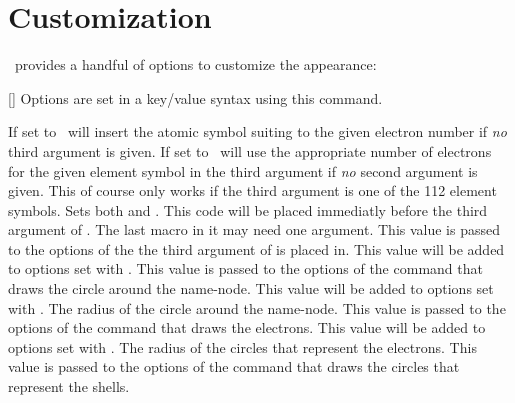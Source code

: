\documentclass[load-preamble+]{cnltx-doc}
\begin{document}
\section{Customization}
\BOHR\ provides a handful of options to customize the appearance:
\begin{commands}
  []
    Options are set in a key/value syntax using this command.
\end{commands}
\begin{options}
    If set to  \BOHR\ will insert the atomic symbol suiting to the
    given electron number if \emph{no} third argument is given.
    If set to  \BOHR\ will use the appropriate number of electrons
    for the given element symbol in the third argument if \emph{no} second
    argument is given.  This of course only works if the third argument is one
    of the 112 element symbols.
    Sets both  and .
  \Default
    This code will be placed immediatly before the third argument of
    .  The last macro in it may need one argument.
  \Default
    This value is passed to the options of the  the third argument
    of  is placed in.
  \Default
    This value will be added to options set with .
    This value is passed to the options of the  command that draws
    the circle around the name-node.
  \Default
    This value will be added to options set with .
  \Default{1em}
    The radius of the circle around the name-node.
    This value is passed to the options of the  command that draws
    the electrons.
  \Default
    This value will be added to options set with .
  \Default{1.5pt}
    The radius of the circles that represent the electrons.
    This value is passed to the options of the  command that draws
    the circles that represent the shells.

\end{options}
\end{document}
